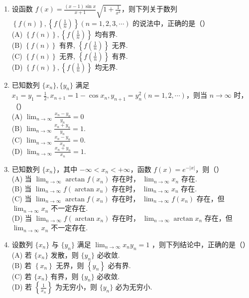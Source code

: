 \documentclass[12pt, a4paper]{ctexart}
\begin{document}
\begin{enumerate}
    \item 设函数 $ f(x)=\frac{(x-1)\sin x}{x+1}\sqrt{1+\frac{1}{x^{2}}} $，则下列关于数列 $ \left\{f(n)\right\},\left\{f\left(\frac{1}{n}\right)\right\}(n=1,2,3,\cdots) $ 的说法中，正确的是（）\\
    (A) $ \left\{f(n)\right\},\left\{f\left(\frac{1}{n}\right)\right\} $ 均有界.\\
    (B) $ \left\{f(n)\right\} $ 有界, $ \left\{f\left(\frac{1}{n}\right)\right\} $ 无界.\\
    (C) $ \left\{f(n)\right\} $ 无界, $ \left\{f\left(\frac{1}{n}\right)\right\} $ 有界. \\
    (D) $ \left\{f(n)\right\},\left\{f\left(\frac{1}{n}\right)\right\} $ 均无界.

    \item 已知数列 $ \{x_{n}\}, \{y_{n}\} $ 满足 $ x_{1}=y_{1}=\frac{1}{2}, x_{n+1}=1-\cos x_{n}, y_{n+1}=y_{n}^{2}(n=1,2,\cdots) $，则当 $ n \to \infty $ 时，（）\\
    (A) $ \lim_{n\to\infty}\frac{x_n-y_n}{y_n}=0 $\\
    (B) $ \lim_{n\to\infty}\frac{x_n+y_n}{y_n}=1 $.\\
    (C) $ \lim_{n\to\infty}\frac{x_n-y_n}{x_n}=0 $.\\
    (D) $ \lim_{n\to\infty}\frac{x_n+y_n}{x_n}=1 $.

    \item 已知数列 $ \{x_{n}\} $，其中 $ -\infty < x_{n} < +\infty $，函数 $ f(x) = e^{-|x|} $，则（）\\
    (A) 当 $ \lim_{n\to\infty}\arctan f(x_n) $ 存在时， $ \lim_{n\to\infty}x_n $ 存在.\\
    (B) 当 $ \lim_{n\to\infty}f\left(\arctan x_{n}\right) $ 存在时， $ \lim_{n\to\infty}x_{n} $ 存在.\\
    (C) 当 $ \lim_{n\to\infty}\arctan f(x_n) $ 存在时， $ \lim_{n\to\infty}f(x_n) $ 存在，但 $ \lim_{n\to\infty}x_n $ 不一定存在.\\
    (D) 当 $ \lim_{n\to\infty}f\left(\arctan x_{n}\right) $ 存在时， $ \lim_{n\to\infty}\arctan x_{n} $ 存在，但 $ \lim_{n\to\infty}x_{n} $ 不一定存在.

    \item 设数列 $ \{x_{n}\} $ 与 $ \{y_{n}\} $ 满足 $ \lim_{n\to\infty}x_{n}y_{n}=1 $ ，则下列结论中，正确的是（）\\
    (A) 若 $ \{x_{n}\} $ 发散，则 $ \{y_{n}\} $ 必收敛.\\
    (B) 若 $ \left\{x_{n}\right\} $ 无界，则 $ \left\{y_{n}\right\} $ 必有界.\\
    (C) 若 $ \{x_{n}\} $ 有界，则 $ \{y_{n}\} $ 必收敛.\\
    (D) 若 $ \left\{\frac{1}{x_{n}}\right\} $ 为无穷小，则 $ \{y_{n}\} $ 必为无穷小.


\end{enumerate}
\end{document}
